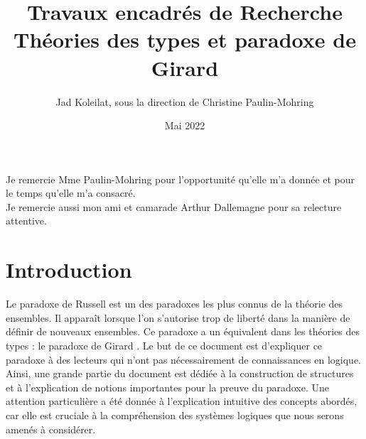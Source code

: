 \documentclass[a4paper,12pt]{article}
\theoremstyle{plain}
\begin{document}

\begin{titlepage}
\title{Travaux encadrés de Recherche\\ Théories des types et paradoxe de Girard} 
\author{Jad Koleilat, sous la direction de Christine Paulin-Mohring }
\date{Mai 2022}
\maketitle
{}
\thispagestyle{empty}
\end{titlepage}


\vspace*{\fill}

Je remercie Mme Paulin-Mohring pour l'opportunité qu'elle m'a donnée et pour le temps qu'elle m'a consacré.\\

Je remercie aussi mon ami et camarade Arthur Dallemagne pour sa relecture attentive. \vspace*{\fill}

\thispagestyle{empty}

\clearpage


\tableofcontents
\thispagestyle{empty}


\clearpage


\section*{Introduction}
\label{introduction}

Le paradoxe de Russell est un des paradoxes les plus connus de la théorie des ensembles. Il apparaît lorsque l'on s'autorise trop de liberté dans la manière de définir de nouveaux ensembles. Ce paradoxe a un équivalent dans les théories des types : le paradoxe de Girard \cite{paradox}. Le but de ce document est d'expliquer ce paradoxe à des lecteurs qui n'ont pas nécessairement de connaissances en logique. Ainsi, une grande partie du document est dédiée à la construction de structures et à l'explication de notions importantes pour la preuve du paradoxe. Une attention particulière a été donnée à l'explication intuitive des concepts abordés, car elle est cruciale à la compréhension des systèmes logiques que nous serons amenés à considérer.\\
\end{document}
